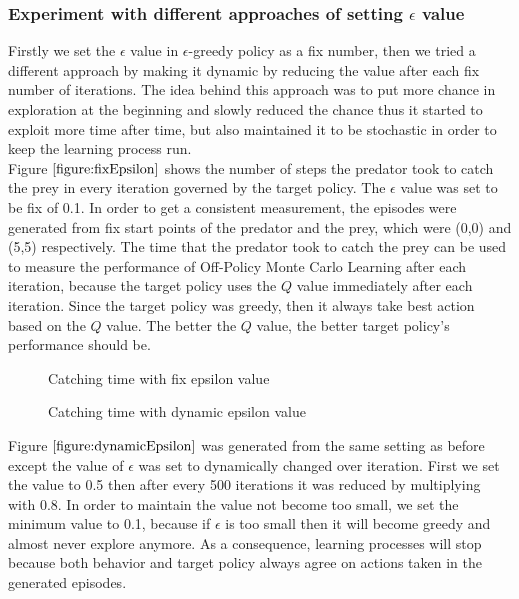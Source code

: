 \documentclass[paper=a4, fontsize=11pt]{scrartcl}
\numberwithin{equation}{section}		%
\numberwithin{figure}{section}			%
\numberwithin{table}{section}				%
\begin{document}
\subsubsection*{Experiment with different approaches of setting $\epsilon$ value}
Firstly we set the $\epsilon$ value in $\epsilon$-greedy policy as a fix number, then we tried a different approach by making it dynamic by reducing the value after each fix number of iterations. The idea behind this approach was to put more chance in exploration at the beginning and slowly reduced the chance thus it started to exploit more time after time, but also maintained it to be stochastic in order to keep the learning process run. \\
Figure $\ref{figure:fixEpsilon}$ shows the number of steps the predator took to catch the prey in every iteration governed by the target policy. The $\epsilon$ value was set to be fix of 0.1. In order to get a consistent measurement, the episodes were generated from fix start points of the predator and the prey, which were (0,0) and (5,5) respectively. The time that the predator took to catch the prey can be used to measure the performance of Off-Policy Monte Carlo Learning after each iteration, because the target policy uses the $Q$ value immediately after each iteration. Since the target policy was greedy, then it always take best action based on the $Q$ value. The better the $Q$ value, the better target policy's performance should be.

\begin{figure}[H] \centering
\caption{Catching time with fix epsilon value} \label{figure:fixEpsilon}
\end{figure}

\begin{figure}[H] \centering
\caption{Catching time with dynamic epsilon value}\label{figure:dynamicEpsilon} \label{figure:dynamicEpsilon}
\end{figure}

Figure $\ref{figure:dynamicEpsilon}$ was generated from the same setting as before except the value of $\epsilon$ was set to dynamically changed over iteration. First we set the value to 0.5 then after every 500 iterations it was reduced by multiplying with 0.8. In order to maintain the value not become too small, we set the minimum value to 0.1, because if $\epsilon$ is too small then it will become greedy and almost never explore anymore. As a consequence, learning processes will stop because both behavior and target policy always agree on actions taken in the generated episodes.
\end{document}
